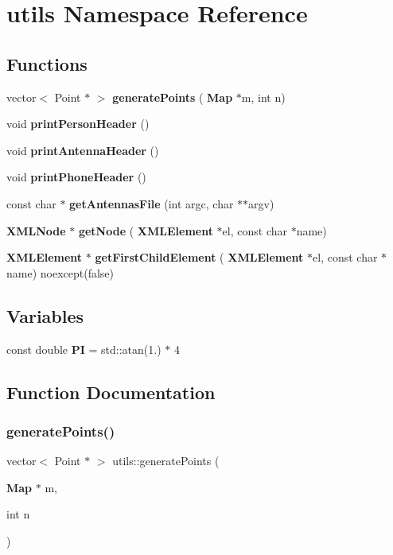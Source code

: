 \section{utils Namespace Reference}
\label{namespaceutils}
\subsection*{Functions}
\begin{DoxyCompactItemize}
\item 
vector$<$ Point $\ast$ $>$ \textbf{ generate\+Points} (\textbf{ Map} $\ast$m, int n)
\item 
void \textbf{ print\+Person\+Header} ()
\item 
void \textbf{ print\+Antenna\+Header} ()
\item 
void \textbf{ print\+Phone\+Header} ()
\item 
const char $\ast$ \textbf{ get\+Antennas\+File} (int argc, char $\ast$$\ast$argv)
\item 
\textbf{ X\+M\+L\+Node} $\ast$ \textbf{ get\+Node} (\textbf{ X\+M\+L\+Element} $\ast$el, const char $\ast$name)
\item 
\textbf{ X\+M\+L\+Element} $\ast$ \textbf{ get\+First\+Child\+Element} (\textbf{ X\+M\+L\+Element} $\ast$el, const char $\ast$name) noexcept(false)
\end{DoxyCompactItemize}
\subsection*{Variables}
\begin{DoxyCompactItemize}
\item 
const double \textbf{ PI} = std\+::atan(1.) $\ast$ 4
\end{DoxyCompactItemize}


\subsection{Function Documentation}
\mbox{\label{namespaceutils_a6b3f4ddb6d0aeaf5a9f0125130af14bb}} 
\subsubsection{generate\+Points()}
{\footnotesize\ttfamily vector$<$ Point $\ast$ $>$ utils\+::generate\+Points (\begin{DoxyParamCaption}\item[{\textbf{ Map} $\ast$}]{m,  }\item[{int}]{n }\end{DoxyParamCaption})}



